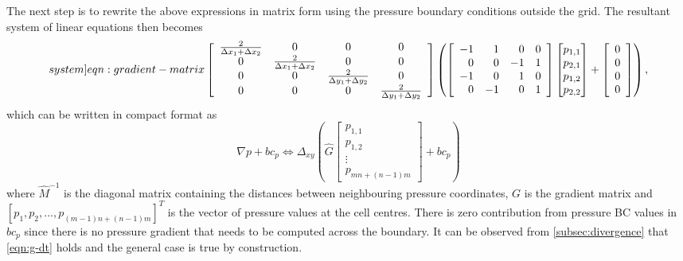 \documentclass{article}
\numberwithin{equation}{section}
\begin{document}
The next step is to rewrite the above expressions in matrix form using the pressure boundary conditions outside the grid. The resultant system of linear equations then becomes
\begin{equation}\label[system]{eqn:gradient-matrix}
\left[\begin{array}{cccccc}
\frac{2}{\Delta x_1+\Delta x_2}  &  0 & 0 & 0 \\
0 & \frac{2}{\Delta x_1+\Delta x_2} &  0 & 0 \\
0 &  0 & \frac{2}{\Delta y_1+\Delta y_2} & 0 \\
0 & 0 & 0 & \frac{2}{\Delta y_1+\Delta y_2}
\end{array}\right]
\left(\left[\begin{array}{rrrr}
-1 & 1 & 0 & 0 \\
0 & 0 & -1 & 1 \\
-1 & 0 & 1 & 0 \\
0 & -1 & 0 & 1
\end{array}\right]
\begin{bmatrix}{}
  p_{1,1} \\
  p_{2,1} \\
  p_{1,2} \\
  p_{2,2} 
\end{bmatrix}
+\left[\begin{array}{c}
0 \\
0 \\
0 \\
0
\end{array}\right]
\right)
,
\end{equation}
which can be written in compact format as
$$
\nabla p+b c_p \Longleftrightarrow 
\Delta_{x y} \left(\hat{G}\left[\begin{array}{c}
p_{1,1} \\
p_{1,2} \\
\vdots \\
p_{m n+(n-1) m}
\end{array}\right]+b c_p\right)
$$
where $\hat{M}^{-1}$ is the diagonal matrix containing the distances between neighbouring pressure coordinates, ${G}$ is the gradient matrix and $[p_1,p_2,...,p_{(m-1) n+(n-1) m}]^T$ is the vector of pressure values at the cell centres. There is zero contribution from pressure BC values in ${bc}_p$ since there is no  pressure gradient that needs to be computed across the boundary. It can be observed from \cref{subsec:divergence} that \cref{eqn:g-dt} holds and the general case is true by construction.
\end{document}
